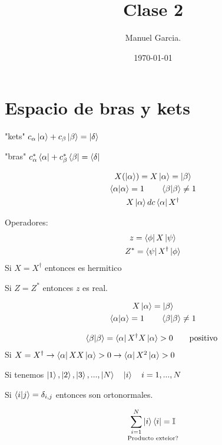 \documentclass{article}
\title{Clase 2 }
\author{Manuel Garcia.}
\date{\today}
\newcommand{\caja}[3]{%
  \begin{tcolorbox}[colback=#1!5!white,colframe=#1!25!black,title=#2]
    #3
  \end{tcolorbox}%
}
\begin{document}
\maketitle

\section{Espacio de bras y kets }
\caja{black}{Repaso}{
  "kets" $ c_\alpha \ket{\alpha} + c_\beta \ket{\beta} = \ket{\delta}$

  "bras"  $c_\alpha^* \bra{\alpha}+ c_\beta^* \bra{\beta} = \bra{\delta}$

  \begin{gather}
    X(\ket{\alpha}) =  X \ket{\alpha} = \ket{\beta}\\
    \bra{\alpha}\ket{\alpha} = 1 \qquad \bra{\beta}\ket{\beta} \neq 1
    \label{eq:norm_ket}\\
    X \ket{\alpha} dc \bra{\alpha}X ^ {\dag}
    \label{eq:operadores }
  \end{gather}
}
Operadores:
\begin{gather}
   z = \bra{\phi }X\ket{\psi} \\
   Z^* = \bra{\psi }X^\dag \ket{\phi} 
\end{gather}
Si $X = X^\dag$ entonces es hermitico

Si $Z = Z^* $ entonces $z$ es real. 

\caja{black}{Repaso }{
  \begin{gather}
     X \ket{\alpha} = \ket{\beta} \\
     \bra{\alpha}\ket{\alpha} = 1 \qquad \bra{\beta}\ket{\beta} \neq 1
  \end{gather}
}
\caja{red}{Operadores }{
  \begin{gather}
    \bra{\beta}\ket{\beta} = \bra{\alpha}X^\dag X \ket{\alpha}>0 \qquad \text{positivo }
    \label{eq:null}
  \end{gather}
  Si $ X = X^\dag \rightarrow \bra{\alpha}XX\ket{\alpha}>0 \rightarrow \bra{\alpha}X^2 \ket{\alpha}>0   $
}
Si tenemos $ \ket{1}, \ket{2 }, \ket{3 },..., \ket{N} \quad \ket{i} \quad i = 1,...,N $

Si $ \bra{i}\ket{j} = \delta _{i,j}   $ entonces son ortonormales. 

\begin{gather}
  \underset{\text{Producto exteior?} }{\sum_{i = 1 }^{N }\ket{i }\bra{i } = \mathbb{I}}
\end{gather}
\end{document}
